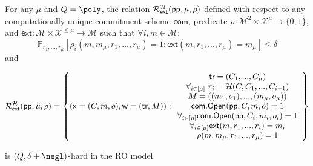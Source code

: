 \begin{lemma}\label{lem:ExtQHard}
For any $\mu$ and $Q = \poly$, the relation $\mathcal{R}^{\mathcal{H}}_\textsf{ext}(\textsf{pp}, \mu, \rho)$ defined with respect to any computationally-unique commitment scheme $\mathsf{com}$, predicate $\rho: \mathcal{M}^2 \times \mathcal{X}^\mu \rightarrow \{0, 1\}$, and $\textsf{ext}: \mathcal{M} \times \mathcal{X}^{\leq \mu} \rightarrow \mathcal{M}$ such that $\forall i, m \in \mathcal{M}$: 
$$\mathbb{P}_{r_1,...,r_{\mu}}[\rho_i(m, m_\mu, r_1,...,r_{\mu}) = 1: \textsf{ext}(m, r_1,...,r_{\mu}) = m_\mu] \leq \delta $$
and 

$$\mathcal{R}^{\mathcal{H}}_\textsf{ext}(\textsf{pp}, \mu, \rho) = \left\{(\mathsf{x} = (C, m, o), \mathsf{w} = (\textsf{{tr}}, M)): \begin{array}{c} \textsf{{tr}} = (C_1,...,C_\mu) \\ \forall_{i \in [\mu]} \ r_i = \mathcal{H}(C, C_1,...,C_{i-1}) \\ M = ((m_1,o_1),...,(m_\mu, o_\mu)) \\ \textsf{com}.\textsf{{Open}}(\textsf{pp}, C, m, o) = 1 \\ \forall_{i \in [\mu]} \textsf{com}.\textsf{{Open}}(\textsf{pp},C_i, m_i, o_i) = 1 \\ \forall_{i \in [\mu]}\textsf{ext}(m, r_1,...,r_{i}) = m_i \\ \rho(m, m_\mu, r_1,...,r_\mu) = 1  \end{array} \right\} $$ 
	
is $(Q, \delta + \negl)$-hard in the RO model. 
\end{lemma}
